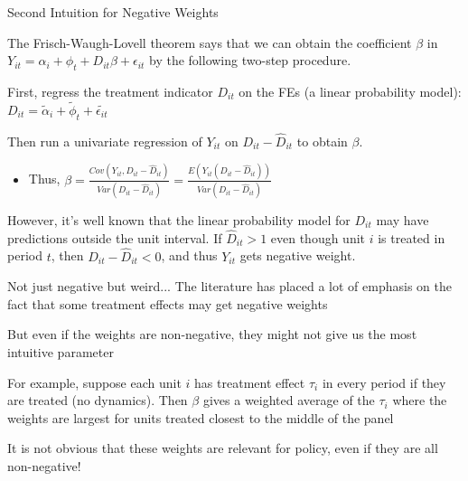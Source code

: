 \documentclass[aspectratio = 169, 13pt]{beamer}
\begin{document}
\begin{frame}{Second Intuition for Negative Weights}
	\begin{wideitemize}
		\item
		The Frisch-Waugh-Lovell theorem says that we can obtain the coefficient $\beta$ in 	
		$Y_{it} = \alpha_i + \phi_t + D_{it} \beta  + \epsilon_{it}$ by the following two-step procedure. 
		
		\item
		First, regress the treatment indicator $D_{it}$ on the FEs (a linear probability model): $D_{it} = \tilde{\alpha}_i + \tilde{\phi}_t + \tilde{\epsilon_{it}} $
		
		\item
		
		\noindent Then run a univariate regression of $Y_{it}$ on $D_{it}-\hat{D}_{it}$ to obtain $\beta$.
		\medskip
		\begin{itemize}
			\item 
			Thus, $\beta = \frac{Cov( Y_{it}, D_{it} - \hat{D}_{it} )}{ Var(D_{it} - \hat{D}_{it})  } =  \frac{E( Y_{it} (D_{it} - \hat{D}_{it})) }{ Var(D_{it} - \hat{D}_{it})  }$
		\end{itemize}
		
		\item
		However, it's well known that the linear probability model for $D_{it}$ may have predictions outside the unit interval. If $\hat{D}_{it}>1$ even though unit $i$ is treated in period $t$, then $D_{it}- \hat{D}_{it} <0$, and thus $Y_{it}$ gets negative weight. 
	\end{wideitemize}
\end{frame}

\begin{frame}{Not just negative but weird...}
	The literature has placed a lot of emphasis on the fact that some treatment effects may get negative weights
	\begin{wideitemize}
		\item
		But even if the weights are non-negative, they might not give us the most intuitive parameter
		
		\item
		For example, suppose each unit $i$ has treatment effect $\tau_i$ in every period if they are treated (no dynamics). Then $\beta$ gives a weighted average of the $\tau_i$ where the weights are largest for units treated closest to the middle of the panel
		
		\item
		It is not obvious that these weights are relevant for policy, even if they are all non-negative!
	\end{wideitemize}
\end{frame}
\end{document}
